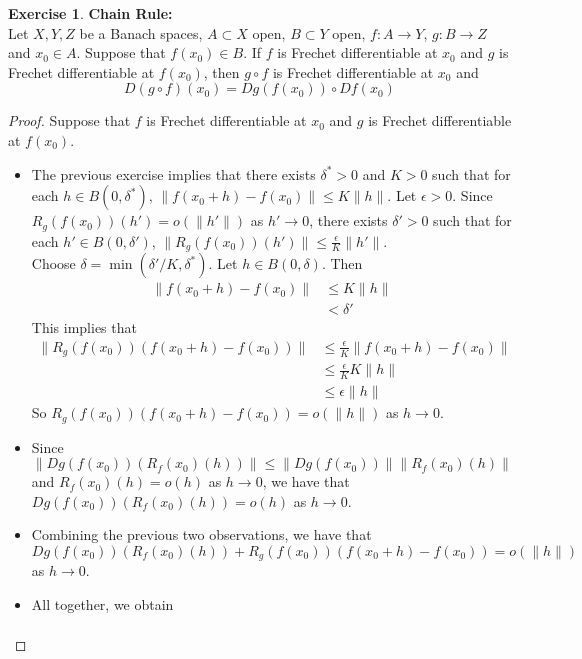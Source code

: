 \documentclass[12pt]{amsart}
\theoremstyle{definition}
\newtheorem{ex}[definition]{Exercise}
\newcommand{\del}{\delta}
\newcommand{\ep}{\epsilon}
\newcommand{\lex}[1]{\label{ex:#1}}
\begin{document}
	\begin{ex} \lex{62009}\textbf{Chain Rule:}\\
	Let $X, Y, Z$ be a Banach spaces, $A \subset X$ open, $B \subset Y$ open, $f:A \rightarrow Y$, $g:B \rightarrow Z$ and $x_0 \in A$. Suppose that $f(x_0) \in B$. If $f$ is Frechet differentiable at $x_0$ and $g$ is Frechet differentiable at $f(x_0)$, then $g \circ f$ is Frechet differentiable at $x_0$ and $$D(g \circ f)(x_0) = Dg(f(x_0)) \circ Df(x_0)$$
	\end{ex}
	
	\begin{proof}
	Suppose that $f$ is Frechet differentiable at $x_0$ and $g$ is Frechet differentiable at $f(x_0)$. 
	
	\begin{itemize}
	\item The previous exercise implies that there exists $\del^* >0$ and $K > 0$ such that for each $h \in B(0, \del^*)$, $\| f(x_0 + h) - f(x_0) \| \leq K \|h\|$. Let $\ep >0$. Since $R_g(f(x_0))(h') = o(\|h'\|)$ as $h' \rightarrow 0$, there exists $\del' >0$ such that for each $h' \in B(0, \del')$, $\|R_g(f(x_0))(h')\| \leq \frac{\ep}{K} \|h'\|$. \\ Choose $\del = \min(\del' / K, \del^*)$. Let $h \in B(0, \del)$. Then 
	\begin{align*}
	\| f(x_0 + h) - f(x_0) \| 
	& \leq K \|h\| \\
	&< \del' 
	\end{align*}
	This implies that 
	\begin{align*}
	\|R_g(f(x_0))(f(x_0 + h) - f(x_0))\| 
	& \leq \frac{\ep}{K} \|f(x_0 + h) - f(x_0)\| \\
	& \leq \frac{\ep}{K} K\|h\| \\
	& \leq \ep \|h\|
	\end{align*}
	So $R_g(f(x_0))(f(x_0 + h) - f(x_0)) = o(\|h\|)$ as $h \rightarrow 0$. \\
	\item Since $\|Dg(f(x_0))(R_f(x_0)(h))\| \leq \|Dg(f(x_0)) \| \|R_f(x_0)(h)\|$ and $R_f(x_0)(h) = o(h)$ as $h \rightarrow 0$, we have that $Dg(f(x_0))(R_f(x_0)(h)) = o(h)$ as $h \rightarrow 0$. \\
	\item Combining the previous two observations, we have that $Dg(f(x_0))(R_f(x_0)(h)) + R_g(f(x_0))(f(x_0 + h) - f(x_0)) = o(\|h\|)$ as $h \rightarrow 0$. \\
	\item All together, we obtain 
	\begin{align*}

\end{align*}
\end{itemize}
\end{proof}
\end{document}
